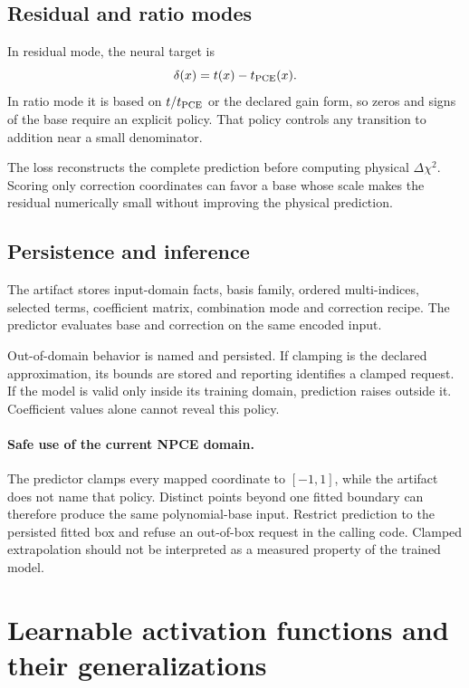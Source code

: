 \documentclass[10pt,aps,prd,twocolumn,nofootinbib]{revtex4-2}
\begin{document}
\subsection{Residual and ratio modes}

In residual mode, the neural target is
\begin{equation*}
 \delta(x)=t(x)-t_{\rm PCE}(x).
\end{equation*}
In ratio mode it is based on \(t/t_{\rm PCE}\) or the declared gain form, so
zeros and signs of the base require an explicit policy.  That policy controls
any transition to addition near a small denominator.

The loss reconstructs the complete prediction before computing physical
\(\Delta\chi^2\).  Scoring only correction coordinates can favor a base whose
scale makes the residual numerically small without improving the physical
prediction.

\subsection{Persistence and inference}

The artifact stores input-domain facts, basis family, ordered multi-indices,
selected terms, coefficient matrix, combination mode and correction recipe.
The predictor evaluates base and correction on the same encoded input.

Out-of-domain behavior is named and persisted.  If clamping is the declared
approximation, its bounds are stored and reporting identifies a clamped
request.  If the model is valid only inside its training domain, prediction
raises outside it.  Coefficient values alone cannot reveal this policy.

\paragraph{Safe use of the current NPCE domain.}
The predictor clamps every mapped coordinate to \([-1,1]\), while the artifact
does not name that policy.  Distinct points beyond one fitted boundary can
therefore produce the same polynomial-base input.  Restrict prediction to the
persisted fitted box and refuse an out-of-box request in the calling code.
Clamped extrapolation should not be interpreted as a measured property of the
trained model.

\section{Learnable activation functions and their generalizations}
\label{sec:activations}
\end{document}

